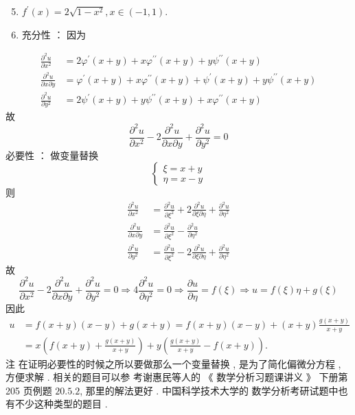 \documentclass[10pt]{article}
\begin{document}
\begin{enumerate}
  \setcounter{enumi}{4}
  \item $f^{\prime}(x)=2 \sqrt{1-x^{2}}, x \in(-1,1)$.

  \item  充分性 ： 因为 

\end{enumerate}
$$
\begin{aligned}
\frac{\partial^{2} u}{\partial x^{2}} &=2 \varphi^{\prime}(x+y)+x \varphi^{\prime \prime}(x+y)+y \psi^{\prime \prime}(x+y) \\
\frac{\partial^{2} u}{\partial x \partial y} &=\varphi^{\prime}(x+y)+x \varphi^{\prime \prime}(x+y)+\psi^{\prime}(x+y)+y \psi^{\prime \prime}(x+y) \\
\frac{\partial^{2} u}{\partial y^{2}} &=2 \psi^{\prime}(x+y)+y \psi^{\prime \prime}(x+y)+x \varphi^{\prime \prime}(x+y)
\end{aligned}
$$
 故 
$$
\frac{\partial^{2} u}{\partial x^{2}}-2 \frac{\partial^{2} u}{\partial x \partial y}+\frac{\partial^{2} u}{\partial y^{2}}=0
$$
 必要性 ： 做变量替换 
$$
\left\{\begin{array}{l}
\xi=x+y \\
\eta=x-y
\end{array}\right.
$$
 则 
$$
\begin{aligned}
\frac{\partial^{2} u}{\partial x^{2}} &=\frac{\partial^{2} u}{\partial \xi^{2}}+2 \frac{\partial^{2} u}{\partial \xi \partial \eta}+\frac{\partial^{2} u}{\partial \eta^{2}} \\
\frac{\partial^{2} u}{\partial x \partial y} &=\frac{\partial^{2} u}{\partial \xi^{2}}-\frac{\partial^{2} u}{\partial \eta^{2}} \\
\frac{\partial^{2} u}{\partial y^{2}} &=\frac{\partial^{2} u}{\partial \xi^{2}}-2 \frac{\partial^{2} u}{\partial \xi \partial \eta}+\frac{\partial^{2} u}{\partial \eta^{2}}
\end{aligned}
$$
 故 
$$
\frac{\partial^{2} u}{\partial x^{2}}-2 \frac{\partial^{2} u}{\partial x \partial y}+\frac{\partial^{2} u}{\partial y^{2}}=0 \Longrightarrow 4 \frac{\partial^{2} u}{\partial \eta^{2}}=0 \Longrightarrow \frac{\partial u}{\partial \eta}=f(\xi) \Longrightarrow u=f(\xi) \eta+g(\xi)
$$
 因此 
$$
\begin{aligned}
u &=f(x+y)(x-y)+g(x+y)=f(x+y)(x-y)+(x+y) \frac{g(x+y)}{x+y} \\
&=x\left(f(x+y)+\frac{g(x+y)}{x+y}\right)+y\left(\frac{g(x+y)}{x+y}-f(x+y)\right) .
\end{aligned}
$$
 注   在证明必要性的时候之所以要做那么一个变量替换 ,  是为了简化偏微分方程 ,  方便求解 .  相关的题目可以参   考谢惠民等人的  《 数学分析习题课讲义 》 下册第  205  页例题  $20.5 .2$,  那里的解法更好 .  中国科学技术大学的   数学分析考研试题中也有不少这种类型的题目 .
\end{document}
